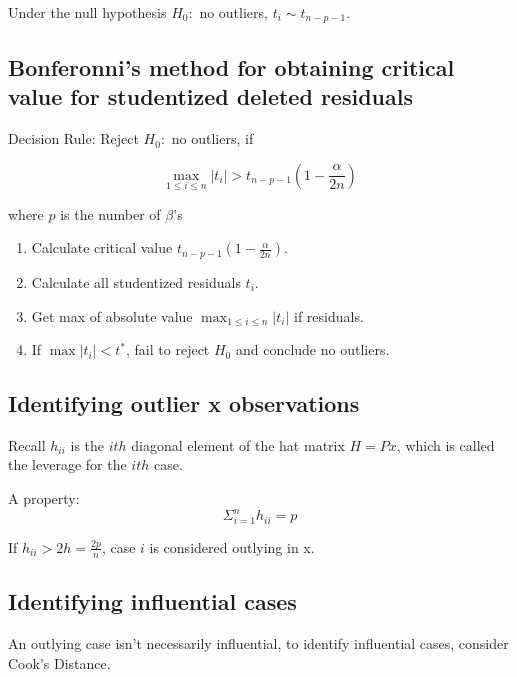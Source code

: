\documentclass[10pt]{article}
\newcommand{\hlDef}[1]{\colorbox{Thistle2}{#1}}
\begin{document}
\begin{multicols}{3}
    Under the null hypothesis $H_0:$ no outliers, $t_i \sim t_{n-p-1}$.

    \subsection{Bonferonni's method for obtaining critical value for studentized deleted residuals}

    Decision Rule: Reject $H_0:$ no outliers, if 

    \begin{equation}
        \max_{1 \leq i \leq n} |t_i| > t_{n - p - 1} (1 - \frac{\alpha}{2n})        
    \end{equation}

    where $p$ is the number of $\beta$'s 

    \begin{enumerate}
        \item Calculate critical value $t_{n - p - 1} (1 - \frac{\alpha}{2n})$.
        \item Calculate all studentized residuals $t_i$.
        \item Get max of absolute value $\max_{1 \leq i \leq n} |t_i|$ if residuals.
        \item If $\max |t_i| < t^*$, fail to reject $H_0$ and conclude no outliers.
    \end{enumerate}

    \subsection{Identifying outlier x observations}

    Recall $h_{ii}$ is the $ith$ diagonal element of the hat matrix $H=Px$, which is called the leverage for the $ith$ case.

    A property: 
    \begin{equation}
        \Sigma^n_{i=1} h_{ii} = p     
    \end{equation}

    If $h_{ii} > 2h = \frac{2p}{n}$, case $i$ is considered outlying in x.

    \subsection{Identifying influential cases}

    An outlying case isn't necessarily influential, to identify influential cases, consider \hlDef{Cook's Distance}.


\end{multicols}
\end{document}
